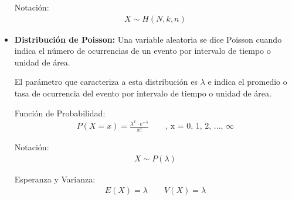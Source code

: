 \documentclass{templateNote}
\begin{document}
\begin{itemize}
  Notación:
  \begin{align*}
    X \sim H(N, k, n)
  \end{align*}

  \newpage
  \item \textbf{Distribución de Poisson:} Una variable aleatoria se dice Poisson cuando indica el número de ocurrencias de
  un evento por intervalo de tiempo o unidad de área.
  
  El parámetro que caracteriza a esta distribución es $\lambda$ e indica el promedio o tasa de ocurrencia
  del evento por intervalo de tiempo o unidad de área.

  Función de Probabilidad:
  \begin{align*}
    P(X=x) = \frac{\lambda^x \cdot e^{-\lambda}}{x!} \qquad \text{, x = 0, 1, 2, ..., } \infty
  \end{align*}

  Notación:
  \begin{align*}
    X \sim P(\lambda)
  \end{align*}

  Esperanza y Varianza:
  \begin{align*}
    E(X) = \lambda \qquad V(X) = \lambda
  \end{align*}
\end{itemize}
\end{document}
